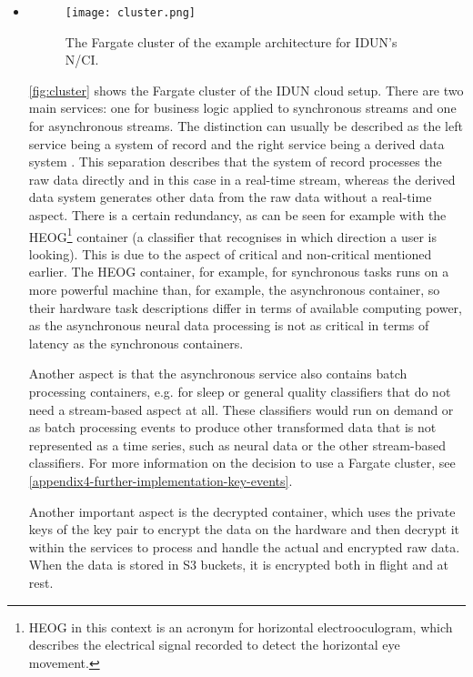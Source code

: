\begin{itemize}
  \item \begin{figure}[!ht]
          \centering
          \texttt{[image: cluster.png]}
          \caption{The Fargate cluster of the example architecture for IDUN's N/CI.}
          \label{fig:cluster}
        \end{figure}

        \autoref{fig:cluster} shows the Fargate cluster of the IDUN cloud setup. There are two main services: one for business logic applied to synchronous streams and one for asynchronous streams. The distinction can usually be described as the left service being a system of record and the right service being a derived data system \citep{kleppmann_designing_2017}. This separation describes that the system of record processes the raw data directly and in this case in a real-time stream, whereas the derived data system generates other data from the raw data without a real-time aspect. There is a certain redundancy, as can be seen for example with the HEOG\footnote{HEOG in this context is an acronym for horizontal electrooculogram, which describes the electrical signal recorded to detect the horizontal eye movement.} container (a classifier that recognises in which direction a user is looking). This is due to the aspect of critical and non-critical mentioned earlier. The HEOG container, for example, for synchronous tasks runs on a more powerful machine than, for example, the asynchronous container, so their hardware task descriptions differ in terms of available computing power, as the asynchronous neural data processing is not as critical in terms of latency as the synchronous containers.

        Another aspect is that the asynchronous service also contains batch processing containers, e.g. for sleep or general quality classifiers that do not need a stream-based aspect at all. These classifiers would run on demand or as batch processing events to produce other transformed data that is not represented as a time series, such as neural data or the other stream-based classifiers. For more information on the decision to use a Fargate cluster, see \autoref{appendix4-further-implementation-key-events}.

        Another important aspect is the decrypted container, which uses the private keys of the key pair to encrypt the data on the hardware and then decrypt it within the services to process and handle the actual and encrypted raw data. When the data is stored in S3 buckets, it is encrypted both in flight and at rest.


\end{itemize}
